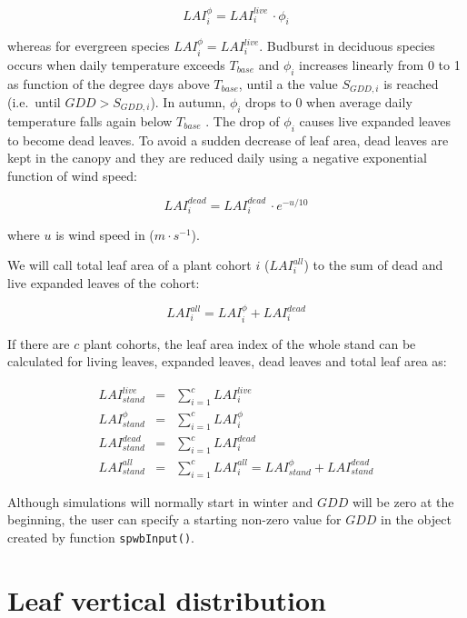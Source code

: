 \documentclass[]{book}
\begin{document}
\begin{equation}
LAI_{i}^{\phi}=LAI^{live}_i\,\cdot\phi_i
\end{equation}

whereas for evergreen species \(LAI_{i}^{\phi}=LAI^{live}_i\). Budburst
in deciduous species occurs when daily temperature exceeds \(T_{base}\)
and \(\phi_i\) increases linearly from 0 to 1 as function of the degree
days above \(T_{base}\), until a the value \(S_{GDD,i}\) is reached
(i.e.~until \(GDD > S_{GDD,i}\)). In autumn, \(\phi_i\) drops to 0 when
average daily temperature falls again below \(T_{base}\)
\citep{Sitch2003}. The drop of \(\phi_i\) causes live expanded leaves to
become dead leaves. To avoid a sudden decrease of leaf area, dead leaves
are kept in the canopy and they are reduced daily using a negative
exponential function of wind speed:

\begin{equation}
LAI^{dead}_i=LAI^{dead}_i\,\cdot e^{- u/10}
\end{equation}

where \(u\) is wind speed in (\(m \cdot s^{-1}\)).

We will call total leaf area of a plant cohort \(i\) (\(LAI^{all}_{i}\))
to the sum of dead and live expanded leaves of the cohort:

\begin{equation}
LAI^{all}_{i} = LAI^{\phi}_{i}+LAI^{dead}_{i}
\end{equation}

If there are \(c\) plant cohorts, the leaf area index of the whole stand
can be calculated for living leaves, expanded leaves, dead leaves and
total leaf area as:

\begin{eqnarray}
LAI^{live}_{stand} &=& \sum_{i=1}^c{LAI_{i}^{live}} \\
LAI^{\phi}_{stand} &=& \sum_{i=1}^c{LAI_{i}^{\phi}} \\
LAI^{dead}_{stand} &=& \sum_{i=1}^c{LAI_{i}^{dead}} \\
LAI^{all}_{stand} &=& \sum_{i=1}^c{LAI_{i}^{all}} = LAI^{\phi}_{stand}+LAI^{dead}_{stand}
\end{eqnarray}

Although simulations will normally start in winter and \(GDD\) will be
zero at the beginning, the user can specify a starting non-zero value
for \(GDD\) in the object created by function \texttt{spwbInput()}.

\section{Leaf vertical distribution}\label{leafdistribution}
\end{document}

